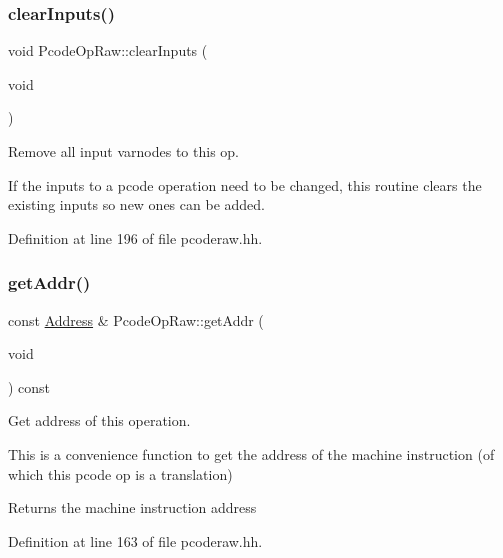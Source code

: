 \subsubsection{\texorpdfstring{clearInputs()}{clearInputs()}}
{\footnotesize\ttfamily void Pcode\+Op\+Raw\+::clear\+Inputs (\begin{DoxyParamCaption}\item[{void}]{ }\end{DoxyParamCaption})\hspace{0.3cm}{\ttfamily [inline]}}



Remove all input varnodes to this op. 

If the inputs to a pcode operation need to be changed, this routine clears the existing inputs so new ones can be added. 

Definition at line 196 of file pcoderaw.\+hh.

\mbox{\label{class_pcode_op_raw_ad6fbe5fdf363a5f46361910de067cc96}} 
\subsubsection{\texorpdfstring{getAddr()}{getAddr()}}
{\footnotesize\ttfamily const \mbox{\hyperlink{class_address}{Address}} \& Pcode\+Op\+Raw\+::get\+Addr (\begin{DoxyParamCaption}\item[{void}]{ }\end{DoxyParamCaption}) const\hspace{0.3cm}{\ttfamily [inline]}}



Get address of this operation. 

This is a convenience function to get the address of the machine instruction (of which this pcode op is a translation) \begin{DoxyReturn}{Returns}
the machine instruction address 
\end{DoxyReturn}


Definition at line 163 of file pcoderaw.\+hh.

